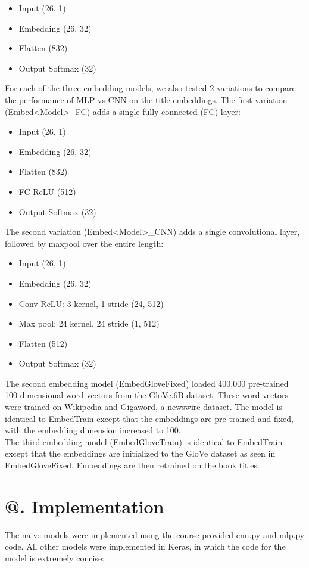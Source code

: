 \documentclass[jou,apacite, 10px]{apa6}
\makeatletter
\newcommand*{\rom}[1]{\expandafter\@slowromancap\romannumeral #1@}
\makeatother
\begin{document}
\begin{itemize}
    \item Input (26, 1)
    \item Embedding (26, 32)
    \item Flatten (832)
    \item Output Softmax (32)
\end{itemize}
For each of the three embedding models, we also tested 2 variations to compare the performance of MLP vs CNN on the title embeddings. The first variation (Embed<Model>\_FC) adds a single fully connected (FC) layer:\\
\begin{itemize}
    \item Input (26, 1)
    \item Embedding (26, 32)
    \item Flatten (832)
    \item FC ReLU (512)
    \item Output Softmax (32)
\end{itemize}\rule{0pt}{4ex}
The second variation (Embed<Model>\_CNN) adds a single convolutional layer, followed by maxpool over the entire length:

\begin{itemize}
    \item Input (26, 1)
    \item Embedding (26, 32)
    \item Conv ReLU: 3 kernel, 1 stride (24, 512)
    \item Max pool: 24 kernel, 24 stride (1, 512)
    \item Flatten (512)
    \item Output Softmax (32)
\end{itemize}
The second embedding model (EmbedGloveFixed) loaded 400,000 pre-trained 100-dimensional word-vectors from the GloVe.6B dataset. These word vectors were trained on Wikipedia and Gigaword, a newswire dataset. The model is identical to EmbedTrain except that the embeddings are pre-trained and fixed, with the embedding dimension increased to 100.\\
The third embedding model (EmbedGloveTrain) is identical to EmbedTrain except that the embeddings are initialized to the GloVe dataset as seen in EmbedGloveFixed. Embeddings are then retrained on the book titles.\\

\section{\rom{5}. Implementation}
The naive models were implemented using the course-provided cnn.py and mlp.py code. All other models were implemented in Keras, in which the code for the model is extremely concise:\\

\end{document}
